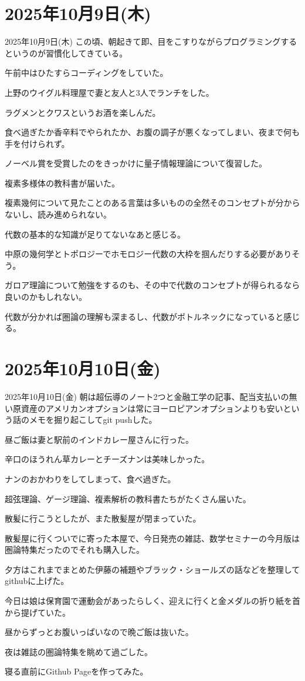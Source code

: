 \documentclass[dvipdfmx, autodetect-engine, aspectratio=169, 10.5pt]{beamer}
\begin{document}
\section{2025年10月9日(木)}

\begin{frame}{2025年10月9日(木)}
	\scriptsize
	この頃、朝起きて即、目をこすりながらプログラミングするというのが習慣化してきている。

	午前中はひたすらコーディングをしていた。

	上野のウイグル料理屋で妻と友人と3人でランチをした。

	ラグメンとクワスというお酒を楽しんだ。

	食べ過ぎたか香辛料でやられたか、お腹の調子が悪くなってしまい、夜まで何も手を付けられず。

	ノーベル賞を受賞したのをきっかけに量子情報理論について復習した。

	複素多様体の教科書が届いた。

	複素幾何について見たことのある言葉は多いものの全然そのコンセプトが分からないし、読み進められない。

	代数の基本的な知識が足りてないなあと感じる。

	中原の幾何学とトポロジーでホモロジー代数の大枠を掴んだりする必要がありそう。

	ガロア理論について勉強をするのも、その中で代数のコンセプトが得られるなら良いのかもしれない。

	代数が分かれば圏論の理解も深まるし、代数がボトルネックになっていると感じる。
\end{frame}

\section{2025年10月10日(金)}

\begin{frame}{2025年10月10日(金)}
	\scriptsize
	朝は超伝導のノート2つと金融工学の記事、配当支払いの無い原資産のアメリカンオプションは常にヨーロピアンオプションよりも安いという話のメモを掘り起こしてgit pushした。

	昼ご飯は妻と駅前のインドカレー屋さんに行った。

	辛口のほうれん草カレーとチーズナンは美味しかった。

	ナンのおかわりをしてしまって、食べ過ぎた。

	超弦理論、ゲージ理論、複素解析の教科書たちがたくさん届いた。

	散髪に行こうとしたが、また散髪屋が閉まっていた。

	散髪屋に行くついでに寄った本屋で、今日発売の雑誌、数学セミナーの今月版は圏論特集だったのでそれも購入した。

	夕方はこれまでまとめた伊藤の補題やブラック・ショールズの話などを整理してgithubに上げた。

	今日は娘は保育園で運動会があったらしく、迎えに行くと金メダルの折り紙を首から提げていた。

	昼からずっとお腹いっぱいなので晩ご飯は抜いた。

	夜は雑誌の圏論特集を眺めて過ごした。

	寝る直前にGithub Pageを作ってみた。
\end{frame}
\end{document}
